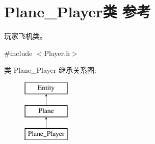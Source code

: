\hypertarget{class_plane___player}{}\section{Plane\+\_\+\+Player类 参考}
\label{class_plane___player}


玩家飞机类。  




{\ttfamily \#include $<$Player.\+h$>$}

类 Plane\+\_\+\+Player 继承关系图\+:\begin{figure}[H]
\begin{center}
\leavevmode
\includegraphics[height=3.000000cm]{class_plane___player}
\end{center}
\end{figure}
